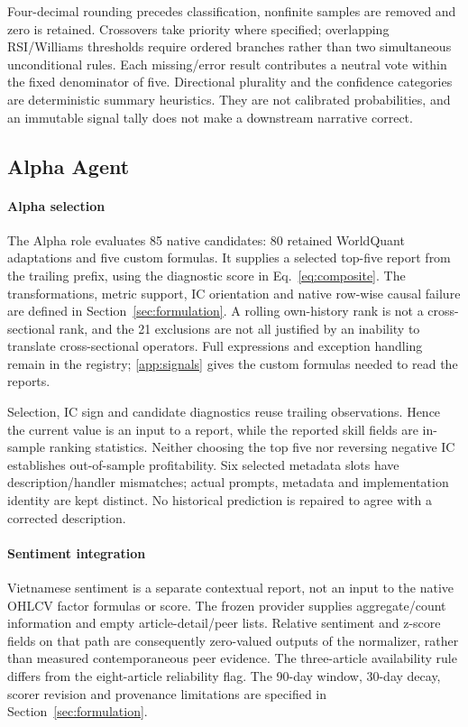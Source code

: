 Four-decimal rounding precedes classification, nonfinite samples are removed and zero is retained. Crossovers take priority where specified; overlapping RSI/Williams thresholds require ordered branches rather than two simultaneous unconditional rules. Each missing/error result contributes a neutral vote within the fixed denominator of five. Directional plurality and the confidence categories are deterministic summary heuristics. They are not calibrated probabilities, and an immutable signal tally does not make a downstream narrative correct.

\subsection{Alpha Agent}
\paragraph{Alpha selection}
The Alpha role evaluates 85 native candidates: 80 retained WorldQuant adaptations and five custom formulas. It supplies a selected top-five report from the trailing prefix, using the diagnostic score in Eq.~\ref{eq:composite}. The transformations, metric support, IC orientation and native row-wise causal failure are defined in Section~\ref{sec:formulation}. A rolling own-history rank is not a cross-sectional rank, and the 21 exclusions are not all justified by an inability to translate cross-sectional operators. Full expressions and exception handling remain in the registry; \ref{app:signals} gives the custom formulas needed to read the reports.

Selection, IC sign and candidate diagnostics reuse trailing observations. Hence the current value is an input to a report, while the reported skill fields are in-sample ranking statistics. Neither choosing the top five nor reversing negative IC establishes out-of-sample profitability. Six selected metadata slots have description/handler mismatches; actual prompts, metadata and implementation identity are kept distinct. No historical prediction is repaired to agree with a corrected description.

\paragraph{Sentiment integration}
Vietnamese sentiment is a separate contextual report, not an input to the native OHLCV factor formulas or score. The frozen provider supplies aggregate/count information and empty article-detail/peer lists. Relative sentiment and z-score fields on that path are consequently zero-valued outputs of the normalizer, rather than measured contemporaneous peer evidence. The three-article availability rule differs from the eight-article reliability flag. The 90-day window, 30-day decay, scorer revision and provenance limitations are specified in Section~\ref{sec:formulation}.

